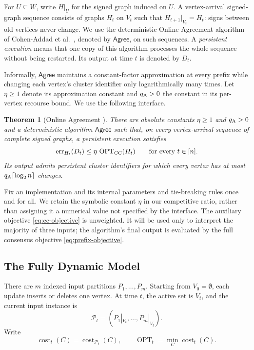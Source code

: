 \documentclass[11pt]{article}
\newtheorem{theorem}{Theorem}[section]
\theoremstyle{definition}
\theoremstyle{remark}
\newcommand{\OPT}{\operatorname{OPT}}
\newcommand{\err}{\operatorname{err}}
\newcommand{\Agree}{\ensuremath{\mathsf{Agree}}}
\newcommand{\1}{\mathbf{1}}
\begin{document}
For $U\subseteq W$, write $H|_U$ for the signed graph induced on $U$.
A vertex-arrival signed-graph sequence consists of graphs $H_t$ on $V_t$
such that $H_{t+1}|_{V_t}=H_t$: signs between old vertices never change.
We use the deterministic Online Agreement algorithm of
Cohen-Addad et al.~\cite{cohen2022online}, denoted by $\Agree$, on such
sequences. A \emph{persistent execution} means that one copy of this
algorithm processes the whole sequence without being restarted.
Its output at time $t$ is denoted by $D_t$.

Informally, $\Agree$ maintains a constant-factor approximation at every
prefix while changing each vertex's cluster identifier only logarithmically
many times. Let $\eta\ge1$ denote its approximation constant and
$q_{\rm A}>0$ the constant in its per-vertex recourse bound.
We use the following interface.

\begin{theorem}[Online Agreement {\cite[Theorems E.2 and F.1]{cohen2022online}}]
\label{thm:agree-blackbox}
There are absolute constants $\eta\ge1$ and $q_{\rm A}>0$ and a
deterministic algorithm $\Agree$ such that, on every vertex-arrival
sequence of complete signed graphs, a persistent execution satisfies
\[
  \err_{H_t}(D_t)\le\eta\,\OPT_{\rm CC}(H_t)
  \qquad\text{for every }t\in[n].
\]
Its output admits persistent cluster identifiers for which every vertex
has at most $q_{\rm A}\lceil\log_2 n\rceil$ changes.
\end{theorem}

Fix an implementation and its internal parameters and tie-breaking rules
once and for all. We retain the symbolic constant $\eta$ in our competitive
ratio, rather than assigning it a numerical value not specified by the
interface. The auxiliary objective \eqref{eq:cc-objective} is unweighted.
It will be used only to interpret the majority of three inputs; the
algorithm's final output is evaluated by the full consensus objective
\eqref{eq:prefix-objective}.

\subsection{The Fully Dynamic Model}
\label{subsec:dynamic-model}

There are $m$ indexed input partitions $P_1,\ldots,P_m$.
Starting from $V_0=\emptyset$, each update inserts or deletes
one vertex. At time $t$, the active set is $V_t$, and the
current input instance is
\[
    \mathcal P_t=(P_1|_{V_t},\ldots,P_m|_{V_t}).
\]
Write
\[
    \operatorname{cost}_t(C)
        =\operatorname{cost}_{\mathcal P_t}(C),
    \qquad
    \operatorname{OPT}_t
        =\min_C \operatorname{cost}_t(C).
\]
\end{document}
